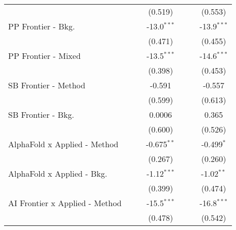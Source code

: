 \begin{tabular}{lcccccc}
                                  &                &                & (0.519)       &                &                & (0.553)\\   
   PP Frontier - Bkg.             &                &                & -13.0$^{***}$ &                &                & -13.9$^{***}$\\   
                                  &                &                & (0.471)       &                &                & (0.455)\\   
   PP Frontier - Mixed            &                &                & -13.5$^{***}$ &                &                & -14.6$^{***}$\\   
                                  &                &                & (0.398)       &                &                & (0.453)\\   
   SB Frontier - Method           &                &                & -0.591        &                &                & -0.557\\   
                                  &                &                & (0.599)       &                &                & (0.613)\\   
   SB Frontier - Bkg.             &                &                & 0.0006        &                &                & 0.365\\   
                                  &                &                & (0.600)       &                &                & (0.526)\\   
   AlphaFold x Applied - Method   &                &                & -0.675$^{**}$ &                &                & -0.499$^{*}$\\   
                                  &                &                & (0.267)       &                &                & (0.260)\\   
   AlphaFold x Applied - Bkg.     &                &                & -1.12$^{***}$ &                &                & -1.02$^{**}$\\   
                                  &                &                & (0.399)       &                &                & (0.474)\\   
   AI Frontier x Applied - Method &                &                & -15.5$^{***}$ &                &                & -16.8$^{***}$\\   
                                  &                &                & (0.478)       &                &                & (0.542)\\   

\end{tabular}

